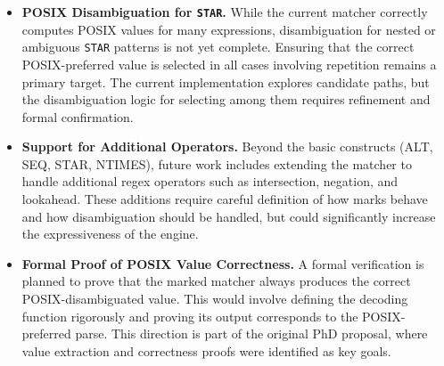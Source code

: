 \documentclass[11pt]{article}
\begin{document}
\begin{itemize}
\item \textbf{POSIX Disambiguation for \texttt{STAR}.}
While the current matcher correctly computes POSIX values for many expressions, disambiguation for nested or ambiguous \texttt{STAR} patterns is not yet complete. Ensuring that the correct POSIX-preferred value is selected in all cases involving repetition remains a primary target. The current implementation explores candidate paths, but the disambiguation logic for selecting among them requires refinement and formal confirmation.

\item \textbf{Support for Additional Operators.}
Beyond the basic constructs (ALT, SEQ, STAR, NTIMES), future work includes extending the matcher to handle additional regex operators such as intersection, negation, and lookahead. These additions require careful definition of how marks behave and how disambiguation should be handled, but could significantly increase the expressiveness of the engine.

\item \textbf{Formal Proof of POSIX Value Correctness.}
A formal verification is planned to prove that the marked matcher always produces the correct POSIX-disambiguated value. This would involve defining the decoding function rigorously and proving its output corresponds to the POSIX-preferred parse. This direction is part of the original PhD proposal, where value extraction and correctness proofs were identified as key goals.


\end{itemize}



\end{document}
